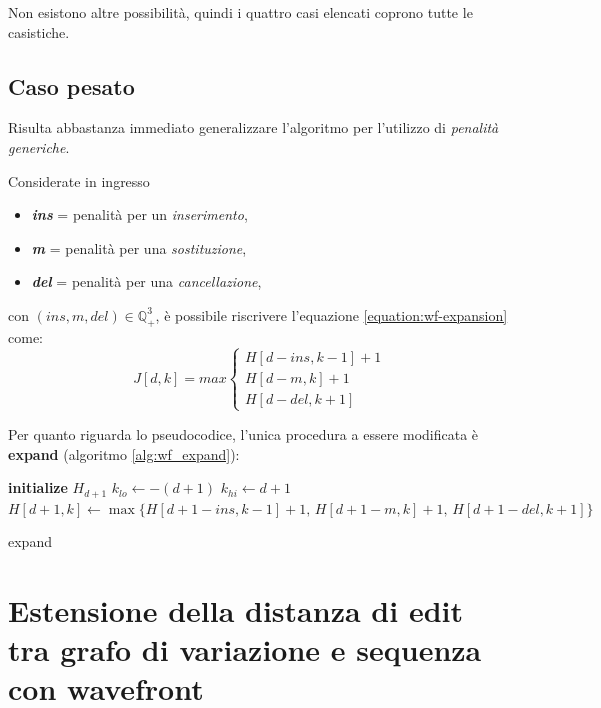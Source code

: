     Non esistono altre possibilità, quindi i quattro casi elencati coprono tutte le
    casistiche.

\subsection{Caso pesato}
    Risulta abbastanza immediato generalizzare l'algoritmo per l'utilizzo di \emph{penalità generiche}. \cite{Eizenga_wfa}
    
    Considerate in ingresso
    \begin{itemize}
        \item \textbf{\textit{ins}} = penalità per un \emph{inserimento},
        \item \textbf{\textit{m}} = penalità per una \emph{sostituzione},
        \item \textbf{\textit{del}} = penalità per una \emph{cancellazione},
    \end{itemize}
    con $(ins, m, del) \in \mathbb{Q}^3_+$, è possibile riscrivere l'equazione \ref{equation:wf-expansion} come:
    \begin{equation}
        J[d, k] = max \begin{cases}
            H[d - ins, k - 1] + 1 \\
            H[d - m, k] + 1 \\
            H[d - del, k + 1]
        \end{cases}
    \label{equation:wf-expansion_weighted}
    \end{equation}

    Per quanto riguarda lo pseudocodice, l'unica procedura a essere modificata è \textbf{expand} (algoritmo \ref{alg:wf_expand}):
    \begin{algorithm}[H]
        \textbf{initialize} $H_{d+1}$\;
        $k_{lo} \gets -(d + 1)$\;
        $k_{hi} \gets d + 1$\;
         {
            $H[d + 1, k] \gets \max\{H[d + 1 - ins, k - 1] + 1, \, H[d + 1 - m, k] + 1, \, H[d + 1 - del, k + 1]\}$\;
        }
        \caption{expand}
        \label{alg:wf_expand_weighted}
    \end{algorithm}
    
\section{Estensione della distanza di edit tra grafo di variazione e sequenza con wavefront}

